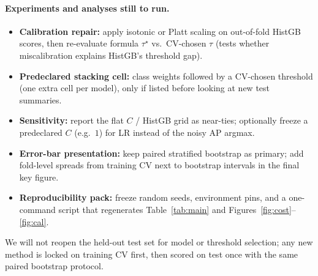\documentclass[10pt,twocolumn,letterpaper]{article}
\begin{document}
\paragraph{Experiments and analyses still to run.}
\begin{itemize}
  \item \textbf{Calibration repair:} apply isotonic or Platt scaling on out-of-fold HistGB scores, then re-evaluate formula $\tau^{\star}$ vs.\ CV-chosen $\tau$ (tests whether miscalibration explains HistGB's threshold gap).
  \item \textbf{Predeclared stacking cell:} class weights followed by a CV-chosen threshold (one extra cell per model), only if listed before looking at new test summaries.
  \item \textbf{Sensitivity:} report the flat $C$ / HistGB grid as near-ties; optionally freeze a predeclared $C$ (e.g.\ $1$) for LR instead of the noisy AP argmax.
  \item \textbf{Error-bar presentation:} keep paired stratified bootstrap as primary; add fold-level spreads from training CV next to bootstrap intervals in the final key figure.
  \item \textbf{Reproducibility pack:} freeze random seeds, environment pins, and a one-command script that regenerates Table~\ref{tab:main} and Figures~\ref{fig:cost}--\ref{fig:cal}.
\end{itemize}
We will not reopen the held-out test set for model or threshold selection; any new method is locked on training CV first, then scored on test once with the same paired bootstrap protocol.
\end{document}
